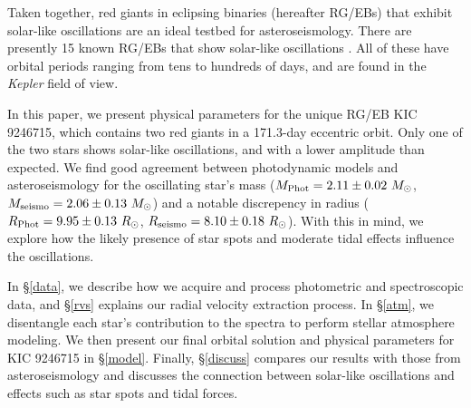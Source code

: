 Taken together, red giants in eclipsing binaries (hereafter RG/EBs) that exhibit solar-like oscillations are an ideal testbed for asteroseismology. There are presently 15 known RG/EBs that show solar-like oscillations \citep{gau13,gau14}. All of these have orbital periods ranging from tens to hundreds of days, and are found in the \emph{Kepler} field of view.

In this paper, we present physical parameters for the unique RG/EB KIC 9246715, which contains two red giants in a 171.3-day eccentric orbit. Only one of the two stars shows solar-like oscillations, and with a lower amplitude than expected. We find good agreement between photodynamic models and asteroseismology for the oscillating star's mass ($M_{\rm{Phot}} = 2.11 \pm 0.02 \ M_{\odot}$, $M_{\rm{seismo}} = 2.06 \pm 0.13 \ M_{\odot}$) and a notable discrepency in radius ($R_{\rm{Phot}} = 9.95 \pm 0.13 \ R_{\odot}$, $R_{\rm{seismo}} = 8.10 \pm 0.18 \ R_{\odot}$). With this in mind, we explore how the likely presence of star spots and moderate tidal effects influence the oscillations.

In \S \ref{data}, we describe how we acquire and process photometric and spectroscopic data, and \S \ref{rvs} explains our radial velocity extraction process. In \S \ref{atm}, we disentangle each star's contribution to the spectra to perform stellar atmosphere modeling. We then present our final orbital solution and physical parameters for KIC 9246715 in \S \ref{model}. Finally, \S \ref{discuss} compares our results with those from asteroseismology and discusses the connection between solar-like oscillations and effects such as star spots and tidal forces.
